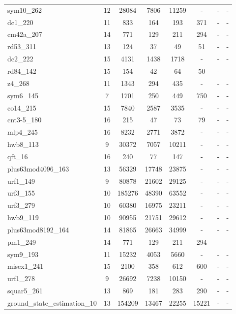 \documentclass[journal]{IEEEtran}
\begin{document}
\begin{table*}[htbp]
\begin{center}
\begin{tabular}{|p{4.3cm}<{\centering}|c|c|c|c|c|c|c|}
            sym10\_262 & 12 & 28084 & 7806 & 11259 & - & - & - \\ 
            dc1\_220 & 11 & 833 & 164 & 193 & 371 & - & - \\ 
            cm42a\_207 & 14 & 771 & 129 & 211 & 294 & - & - \\ 
            rd53\_311 & 13 & 124 & 37 & 49 & 51 & - & - \\ 
            dc2\_222 & 15 & 4131 & 1438 & 1718 & - & - & - \\ 
            rd84\_142 & 15 & 154 & 42 & 64 & 50 & - & - \\ 
            z4\_268 & 11 & 1343 & 294 & 435 & - & - & - \\ 
            sym6\_145 & 7 & 1701 & 250 & 449 & 750 & - & - \\ 
            co14\_215 & 15 & 7840 & 2587 & 3535 & - & - & - \\ 
            cnt3-5\_180 & 16 & 215 & 47 & 73 & 79 & - & - \\ 
            mlp4\_245 & 16 & 8232 & 2771 & 3872 & - & - & - \\ 
            hwb8\_113 & 9 & 30372 & 7057 & 10211 & - & - & - \\ 
            qft\_16 & 16 & 240 & 77 & 147 & - & - & - \\ 
            plus63mod4096\_163 & 13 & 56329 & 17748 & 23875 & - & - & - \\ 
            urf1\_149 & 9 & 80878 & 21602 & 29125 & - & - & - \\ 
            urf3\_155 & 10 & 185276 & 48390 & 63552 & - & - & - \\ 
            urf3\_279 & 10 & 60380 & 16975 & 23211 & - & - & - \\ 
            hwb9\_119 & 10 & 90955 & 21751 & 29612 & - & - & - \\ 
            plus63mod8192\_164 & 14 & 81865 & 26663 & 34999 & - & - & - \\ 
            pm1\_249 & 14 & 771 & 129 & 211 & 294 & - & - \\ 
            sym9\_193 & 11 & 15232 & 4053 & 5660 & - & - & - \\ 
            misex1\_241 & 15 & 2100 & 358 & 612 & 600 & - & - \\ 
            urf1\_278 & 9 & 26692 & 7238 & 10150 & - & - & - \\ 
            squar5\_261 & 13 & 869 & 181 & 283 & 290 & - & - \\ 
            ground\_state\_estimation\_10 & 13 & 154209 & 13467 & 22255 & 15221 & - & - \\ 

\end{tabular}
\end{center}
\end{table*}
\end{document}
